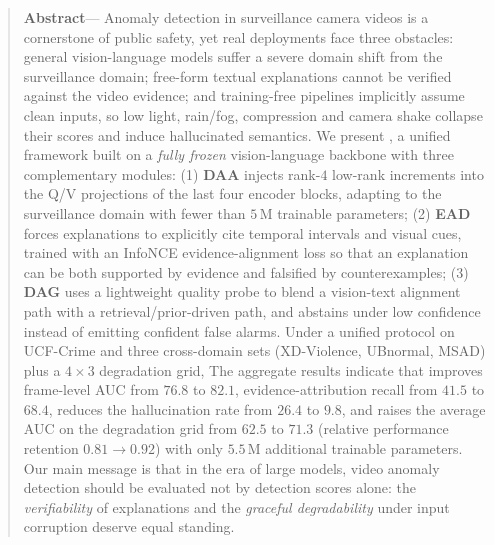\begin{abstract}
\vspace{0.6em}
\noindent\textbf{Abstract}--- Anomaly detection in surveillance camera videos is a cornerstone of public safety, yet real deployments face three obstacles: general vision-language models suffer a severe domain shift from the surveillance domain; free-form textual explanations cannot be verified against the video evidence; and training-free pipelines implicitly assume clean inputs, so low light, rain/fog, compression and camera shake collapse their scores and induce hallucinated semantics. We present \evivad{}, a unified framework built on a \emph{fully frozen} vision-language backbone with three complementary modules: (1) \textbf{DAA} injects rank-$4$ low-rank increments into the Q/V projections of the last four encoder blocks, adapting to the surveillance domain with fewer than $5$\,M trainable parameters; (2) \textbf{EAD} forces explanations to explicitly cite temporal intervals and visual cues, trained with an InfoNCE evidence-alignment loss so that an explanation can be both supported by evidence and falsified by counterexamples; (3) \textbf{DAG} uses a lightweight quality probe to blend a vision-text alignment path with a retrieval/prior-driven path, and abstains under low confidence instead of emitting confident false alarms. Under a unified protocol on UCF-Crime and three cross-domain sets (XD-Violence, UBnormal, MSAD) plus a $4\times3$ degradation grid, The aggregate results indicate that \evivad{} improves frame-level AUC from $76.8$ to $82.1$, evidence-attribution recall from $41.5$ to $68.4$, reduces the hallucination rate from $26.4$ to $9.8$, and raises the average AUC on the degradation grid from $62.5$ to $71.3$ (relative performance retention $0.81 \rightarrow 0.92$) with only $5.5$\,M additional trainable parameters. Our main message is that in the era of large models, video anomaly detection should be evaluated not by detection scores alone: the \emph{verifiability} of explanations and the \emph{graceful degradability} under input corruption deserve equal standing.
\end{abstract}
